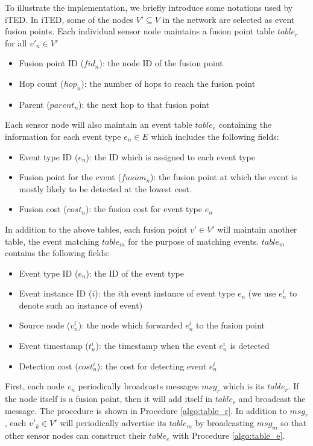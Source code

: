 To illustrate the implementation, we briefly introduce some notations used by iTED. In iTED, some of the nodes \(V'\subseteq V\) in the network are selected as event fusion points. Each individual sensor node maintains a fusion point table \(table_r\) for all \(v'_n\in V'\)
\begin{itemize}
\item Fusion point ID (\(fid_n\)): the node ID of the fusion point
\item	Hop count (\(hop_n\)): the number of hops to reach the fusion point
\item	Parent (\(parent_n\)): the next hop to that fusion point
\end{itemize}
Each sensor node will also maintain an event table \(table_e\) containing the information for each event type \(e_n\in E\) which includes the following fields:
\begin{itemize}
\item Event type ID (\(e_n\)): the ID which is assigned to each event type
\item Fusion point for the event (\(fusion_n\)): the fusion point at which the event is mostly likely to be detected at the lowest cost.
\item Fusion cost (\(cost_n\)): the fusion cost for event type \(e_n\)
\end{itemize}
In addition to the above tables, each fusion point \(v'\in V'\) will maintain another table, the event matching \(table_m\) for the purpose of matching events. \(table_m\) contains the following fields:
\begin{itemize}
\item Event type ID (\(e_n\)): the ID of the event type
\item Event instance ID (\(i\)): the \(i\)th event instance of event type \(e_n\) (we use \(e_n^i\) to denote such an instance of event)
\item Source node (\(v_n^i\)): the node which forwarded \(e_n^i\) to the fusion point
\item Event timestamp (\(t_n^i\)): the timestamp when the event \(e_n^i\) is detected
\item Detection cost (\(cost_n^i\)): the cost for detecting event \(e_n^i\)
\end{itemize}

First, each node \(v_n\) periodically broadcasts messages \(msg_r\) which is its \(table_r\). If the node itself is a fusion point, then it will add itself in \(table_r\) and broadcast the message. The procedure is shown in Procedure \ref{algo:table_r}. In addition to \(msg_r\), each \(v'_k\in V'\) will periodically advertise its \(table_m\) by broadcasting \(msg_m\) so that other sensor nodes can construct their \(table_e\) with Procedure \ref{algo:table_e}.

